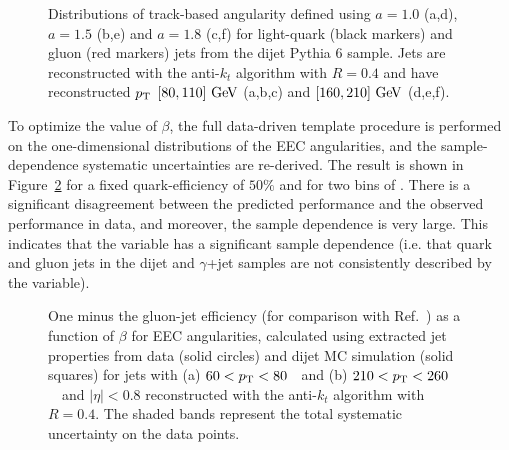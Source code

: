 \begin{figure}[!h]
	\centering

	\caption{ Distributions of track-based angularity defined using $a=1.0$ (a,d), $a=1.5$ (b,e) and
	  $a=1.8$ (c,f) for light-quark (black markers) and gluon (red markers) jets from the dijet 
	  Pythia 6 sample. Jets are reconstructed with the anti-$k_t$ algorithm with $R=0.4$ and
	  have reconstructed $p_{\text{T}}$ $[80,110] \GeV$ (a,b,c) and $[160,210] \GeV$ (d,e,f). }
	\label{fig:angularity}
\end{figure}

To optimize the value of $\beta$, the full data-driven template procedure is performed on the one-dimensional distributions of the EEC angularities, and the sample-dependence systematic uncertainties are re-derived. The result is shown in Figure~\ref{fig:jet-reconstruction:qg:angSummary} for a fixed quark-efficiency of $50\%$ and for two bins of \pt. There is a significant disagreement between the predicted performance and the observed performance in data, and moreover, the sample dependence is very large. This indicates that the variable has a significant sample dependence (i.e. that quark and gluon jets in the dijet and $\gamma$+jet samples are not consistently described by the variable). 

\begin{figure}[htp]
\begin{center}
\caption{ 
One minus the gluon-jet efficiency (for comparison with Ref.~\cite{EEC}) as a function of 
$\beta$ for EEC angularities, calculated using extracted jet properties from 
data (solid circles) and dijet  MC simulation (solid squares) for jets with (a) $60<p_{\text{T}}<80$~\GeV\
and (b) $210<p_{\text{T}}<260$~\GeV\ and $|\eta|<0.8$ reconstructed with the anti-$k_t$ algorithm with $R=0.4$. 
The shaded bands represent the total systematic uncertainty on the data points.
}
\label{fig:jet-reconstruction:qg:angSummary}
\end{center}
\end{figure}

